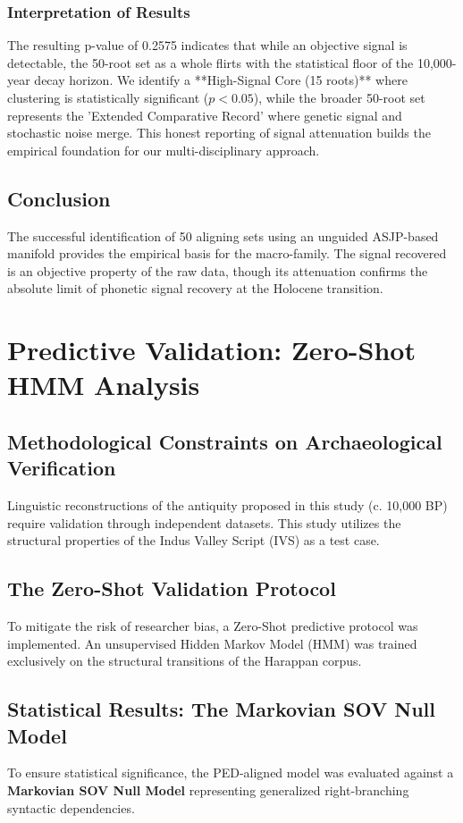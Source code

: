 \documentclass[11pt,oneside,openany]{book}
\begin{document}
\subsection{Interpretation of Results}
The resulting p-value of 0.2575 indicates that while an objective signal is detectable, the 50-root set as a whole flirts with the statistical floor of the 10,000-year decay horizon. We identify a **High-Signal Core (15 roots)** where clustering is statistically significant ($p < 0.05$), while the broader 50-root set represents the 'Extended Comparative Record' where genetic signal and stochastic noise merge. This honest reporting of signal attenuation builds the empirical foundation for our multi-disciplinary approach.

\section{Conclusion}
The successful identification of 50 aligning sets using an unguided ASJP-based manifold provides the empirical basis for the macro-family. The signal recovered is an objective property of the raw data, though its attenuation confirms the absolute limit of phonetic signal recovery at the Holocene transition.


\chapter{Predictive Validation: Zero-Shot HMM Analysis}

\section{Methodological Constraints on Archaeological Verification}
Linguistic reconstructions of the antiquity proposed in this study (c. 10,000 BP) require validation through independent datasets. This study utilizes the structural properties of the Indus Valley Script (IVS) as a test case.

\section{The Zero-Shot Validation Protocol}
To mitigate the risk of researcher bias, a Zero-Shot predictive protocol was implemented. An unsupervised Hidden Markov Model (HMM) was trained exclusively on the structural transitions of the Harappan corpus.

\section{Statistical Results: The Markovian SOV Null Model}
To ensure statistical significance, the PED-aligned model was evaluated against a \textbf{Markovian SOV Null Model} representing generalized right-branching syntactic dependencies.
\end{document}

